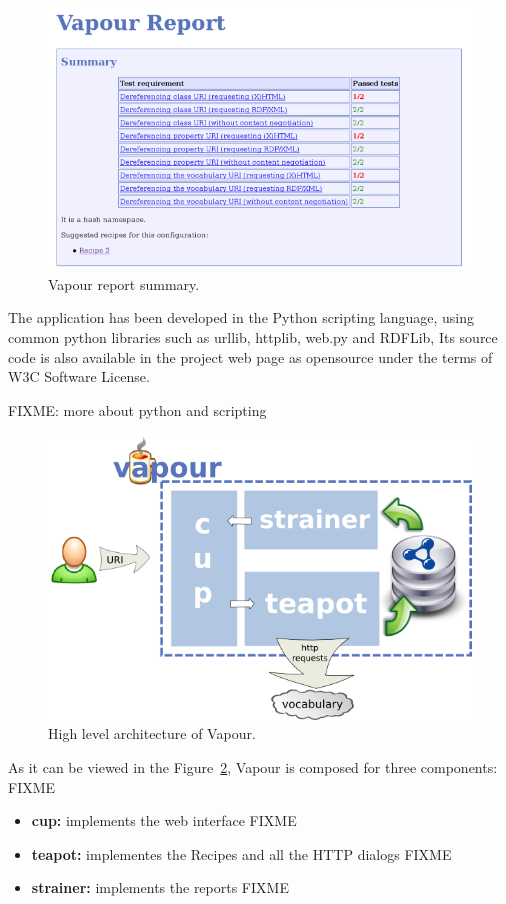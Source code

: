 \begin{figure}
 \centering
 \includegraphics[width=12cm]{images/report-summary.png}
 \caption{\label{fig:report-summary}Vapour report summary.}
\end{figure}

The application has been developed in the Python scripting language, using common
python libraries such as urllib, httplib, web.py and RDFLib, Its source code is 
also available in the project web page as opensource under the terms of W3C Software 
License.

FIXME: more about python and scripting

\begin{figure}
 \centering
 \includegraphics[width=12cm]{images/arch.png}
 \caption{\label{fig:arch}High level architecture of Vapour.}
\end{figure}

As it can be viewed in the Figure~\ref{fig:arch}, Vapour is composed for three 
components: FIXME

\begin{itemize}

  \item \textbf{cup:} implements the web interface FIXME

  \item \textbf{teapot:} implementes the Recipes and all the HTTP dialogs FIXME

  \item \textbf{strainer:} implements the reports FIXME

\end{itemize}

